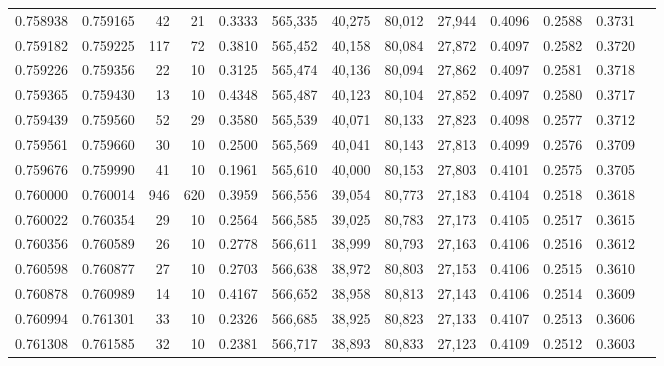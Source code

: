 \begin{tabular}{rrrrrrrrrrrrr}
0.758938 & 0.759165 &    42 &  21 &                                     0.3333 & 565,335 &  40,275 &  80,012 &  27,944 & 0.4096 & 0.2588 & 0.3731 \\
0.759182 & 0.759225 &   117 &  72 &                                     0.3810 & 565,452 &  40,158 &  80,084 &  27,872 & 0.4097 & 0.2582 & 0.3720 \\
0.759226 & 0.759356 &    22 &  10 &                                     0.3125 & 565,474 &  40,136 &  80,094 &  27,862 & 0.4097 & 0.2581 & 0.3718 \\
0.759365 & 0.759430 &    13 &  10 &                                     0.4348 & 565,487 &  40,123 &  80,104 &  27,852 & 0.4097 & 0.2580 & 0.3717 \\
0.759439 & 0.759560 &    52 &  29 &                                     0.3580 & 565,539 &  40,071 &  80,133 &  27,823 & 0.4098 & 0.2577 & 0.3712 \\
0.759561 & 0.759660 &    30 &  10 &                                     0.2500 & 565,569 &  40,041 &  80,143 &  27,813 & 0.4099 & 0.2576 & 0.3709 \\
0.759676 & 0.759990 &    41 &  10 &                                     0.1961 & 565,610 &  40,000 &  80,153 &  27,803 & 0.4101 & 0.2575 & 0.3705 \\
0.760000 & 0.760014 &   946 & 620 &                                     0.3959 & 566,556 &  39,054 &  80,773 &  27,183 & 0.4104 & 0.2518 & 0.3618 \\
0.760022 & 0.760354 &    29 &  10 &                                     0.2564 & 566,585 &  39,025 &  80,783 &  27,173 & 0.4105 & 0.2517 & 0.3615 \\
0.760356 & 0.760589 &    26 &  10 &                                     0.2778 & 566,611 &  38,999 &  80,793 &  27,163 & 0.4106 & 0.2516 & 0.3612 \\
0.760598 & 0.760877 &    27 &  10 &                                     0.2703 & 566,638 &  38,972 &  80,803 &  27,153 & 0.4106 & 0.2515 & 0.3610 \\
0.760878 & 0.760989 &    14 &  10 &                                     0.4167 & 566,652 &  38,958 &  80,813 &  27,143 & 0.4106 & 0.2514 & 0.3609 \\
0.760994 & 0.761301 &    33 &  10 &                                     0.2326 & 566,685 &  38,925 &  80,823 &  27,133 & 0.4107 & 0.2513 & 0.3606 \\
0.761308 & 0.761585 &    32 &  10 &                                     0.2381 & 566,717 &  38,893 &  80,833 &  27,123 & 0.4109 & 0.2512 & 0.3603 \\

\end{tabular}
